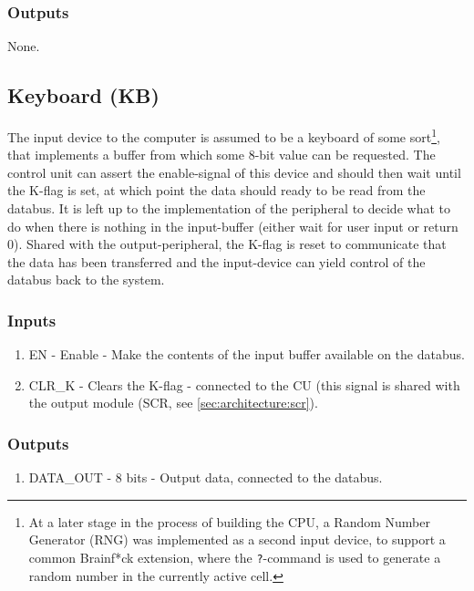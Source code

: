 \subsubsection*{Outputs}
None.

\subsection{Keyboard (KB)} \label{sec:architecture:kb}
The input device to the computer is assumed to be a keyboard of some sort\footnote{At a later stage in the process of building the CPU, a Random Number Generator (RNG) was implemented as a second input device, to support a common Brainf*ck extension, where the \texttt{?}-command is used to generate a random number in the currently active cell.}, that implements a buffer from which some 8-bit value can be requested. The control unit can assert the enable-signal of this device and should then wait until the K-flag is set, at which point the data should ready to be read from the databus. It is left up to the implementation of the peripheral to decide what to do when there is nothing in the input-buffer (either wait for user input or return 0). Shared with the output-peripheral, the K-flag is reset to communicate that the data has been transferred and the input-device can yield control of the databus back to the system.

\subsubsection*{Inputs}
\begin{enumerate}
\itemsep0em 
\item EN - Enable - Make the contents of the input buffer available on the databus.
\item CLR\_K - Clears the K-flag - connected to the CU (this signal is shared with the output module (SCR, see \ref{sec:architecture:scr}).
\end{enumerate}

\subsubsection*{Outputs}
\begin{enumerate}
\itemsep0em 
\item DATA\_OUT - 8 bits - Output data, connected to the databus.
\end{enumerate}



